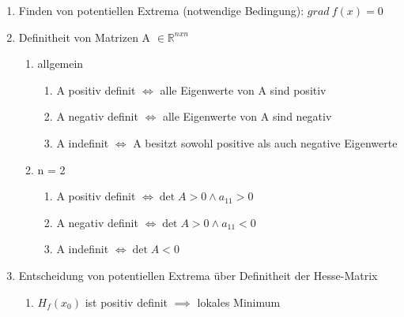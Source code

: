\documentclass[twoside]{article}
\begin{document}
				\begin{enumerate}[]
					\item Finden von potentiellen Extrema (notwendige Bedingung): \begin{math} grad \ f(x) = 0\end{math}
					\item Definitheit von Matrizen A \begin{math} \in \mathbb{R}^{nxn} \end{math}
						\begin{enumerate}[]
							\item allgemein
								\begin{enumerate}[]
									\item A positiv definit \begin{math} \Leftrightarrow \end{math} alle Eigenwerte von A sind positiv
									\item A negativ definit \begin{math} \Leftrightarrow \end{math} alle Eigenwerte von A sind negativ				
									\item A indefinit \begin{math} \Leftrightarrow \end{math} A besitzt sowohl positive als auch negative Eigenwerte
								\end{enumerate}
							\item n = 2 
								\begin{enumerate}[]
									\item A positiv definit \begin{math} \Leftrightarrow \det A > 0 \wedge a_{11} > 0 \end{math}
									\item A negativ definit \begin{math} \Leftrightarrow \det A > 0 \wedge a_{11} < 0 \end{math}
									\item A indefinit \begin{math} \Leftrightarrow \det A < 0 \end{math}
								\end{enumerate}
						\end{enumerate}
					\item Entscheidung von potentiellen Extrema über Definitheit der Hesse-Matrix
						\begin{enumerate}[]
							\item \begin{math} H_f(x_0) \end{math} ist positiv definit \begin{math} \implies \end{math}  lokales Minimum 

\end{enumerate}
\end{enumerate}
\end{document}

